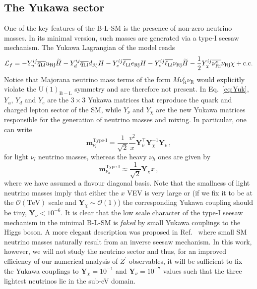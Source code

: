 \documentclass[a4paper,11pt]{article}
\renewcommand{\(}{\left(}
\renewcommand{\)}{\right)}
\renewcommand{\[}{\left[}
\renewcommand{\]}{\right]}
\newcommand{\U}[1]{\mathrm{U}(1)_{\mathrm{#1}}}			%
\newcommand{\ro}[1]{\textrm{#1}}
\begin{document}
\subsection{The Yukawa sector}

One of the key features of the B-L-SM is the presence of non-zero neutrino masses. In its minimal version, such masses are generated via a type-I seesaw mechanism. The Yukawa Lagrangian of the model reads
\begin{equation}
\begin{aligned}
\mathcal{L}_f = 
-Y_u^{ij} \overline{q_{\rm L i}} u_{\rm R j} \widetilde{H} 
-Y_d^{ij} \overline{q_{\rm L i}} d_{\rm R j} H
-Y_e^{ij} \overline{\ell_{\rm L i}} e_{\rm R j} H
- Y_\nu^{ij} \overline{\ell_{\rm L i}} \nu_{\rm R j} \widetilde{H}
	-\dfrac{1}{2} Y_\chi^{ij} \overline{\nu_{\rm R i}^c} \nu_{\rm R j} \chi + {\rm c.c.}
\end{aligned}
\label{eq:Yuk}
\end{equation}
Notice that Majorana neutrino mass terms of the form $M \overline{\nu_\ro{R}^c} \nu_\ro{R}$ would explicitly violate the $\U{B-L}$ symmetry and are therefore not present. In Eq.~\eqref{eq:Yuk}, $Y_u$, $Y_d$ and $Y_e$ are the $3 \times 3$ Yukawa matrices that reproduce the quark and charged lepton sector of the SM, while $Y_\nu$ and $Y_\chi$ are the new Yukawa matrices responsible for the generation of neutrino masses and mixing. In particular, one can write
\begin{equation}
	\bm{m}_{\nu_l}^\ro{Type-I} = \dfrac{1}{\sqrt{2}}\dfrac{v^2}{x} \bm{Y}_\nu^\top \bm{Y}^{-1}_\chi \bm{Y}_\nu\,,
\end{equation}
%
for light $\nu_l$ neutrino masses, whereas the heavy $\nu_h$ ones are given by
\begin{equation}
	\bm{m}_{\nu_h}^\ro{Type-I} \approx \dfrac{1}{\sqrt{2}} \bm{Y}_\chi x\,,
\end{equation} 
where we have assumed a flavour diagonal basis. Note that the smallness of light neutrino masses imply that either the $x$ VEV is very large or (if we fix it to be at the $\mathcal{O}\(\ro{TeV}\)$ scale and $\bm{Y}_\chi \sim \mathcal{O}\(1\)$) the corresponding Yukawa coupling should be tiny, $\bm{Y}_\nu < 10^{-6}$. It is clear that the low scale character of the type-I seesaw mechanism in the minimal B-L-SM is \textit{faked} by small Yukawa couplings to the Higgs boson. A more elegant description was proposed in Ref.~\cite{Khalil:2010iu} where small SM neutrino masses naturally result from an inverse seesaw mechanism. In this work, however, we will not study the neutrino sector and thus, for an improved efficiency of our numerical analysis of $Z^\prime$ observables, it will be sufficient to fix the Yukawa couplings to $\bm{Y}_\chi = 10^{-1}$ and $\bm{Y}_\nu = 10^{-7}$ values such that the three lightest neutrinos lie in the sub-eV domain.
\end{document}
